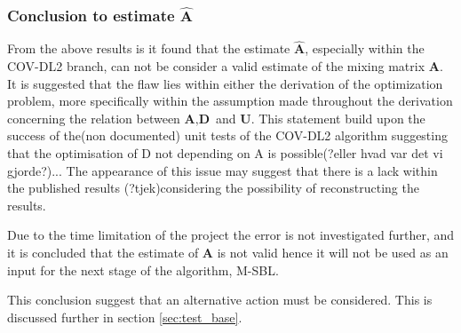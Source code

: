 \subsubsection{Conclusion to estimate $\hat{\textbf{A}}$}
From the above results is it found that the estimate $\hat{\textbf{A}}$, especially within the COV-DL2 branch, can not be consider a valid estimate of the mixing matrix $\textbf{A}$. It is suggested that the flaw lies within either the  derivation of the optimization problem, more specifically within the assumption made throughout the derivation concerning the relation between $\textbf{A}, \textbf{D}$ and $\textbf{U}$. This statement build upon the success of the(non documented) unit tests of the COV-DL2 algorithm suggesting that the optimisation of D not depending on A is possible(?eller hvad var det vi gjorde?)...
The appearance of this issue may suggest that there is a lack within the published results \cite{Balkan2015}(?tjek)considering the possibility of reconstructing the results.  

Due to the time limitation of the project the error is not investigated further, and it is concluded that the estimate of $\textbf{A}$ is not valid hence it will not be used as an input for the next stage of the algorithm, M-SBL. 

This conclusion suggest that an alternative action must be considered. This is discussed further in section \ref{sec:test_base}.

